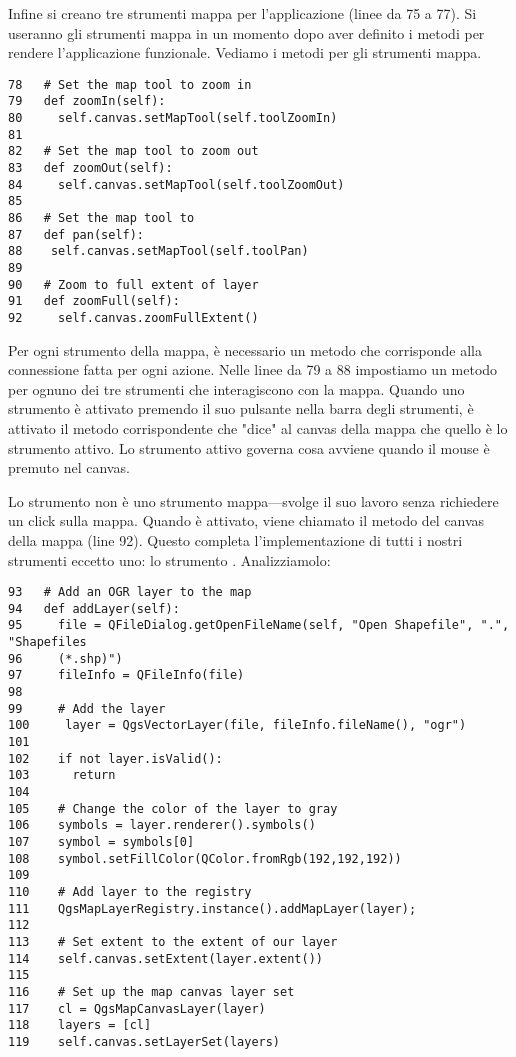 Infine si creano tre strumenti mappa per l'applicazione (linee da 75 a
77). Si useranno gli strumenti mappa in un momento dopo aver definito i metodi per rendere l'applicazione funzionale. Vediamo i metodi per gli strumenti mappa.

\begin{verbatim}
78   # Set the map tool to zoom in
79   def zoomIn(self):
80     self.canvas.setMapTool(self.toolZoomIn)
81 
82   # Set the map tool to zoom out
83   def zoomOut(self):
84     self.canvas.setMapTool(self.toolZoomOut)
85 
86   # Set the map tool to 
87   def pan(self):
88    self.canvas.setMapTool(self.toolPan)
89 
90   # Zoom to full extent of layer
91   def zoomFull(self):
92     self.canvas.zoomFullExtent()
\end{verbatim}

Per ogni strumento della mappa, è necessario un metodo che corrisponde alla connessione fatta per ogni azione. Nelle linee da 79 a 88 impostiamo un metodo per ognuno dei tre strumenti che interagiscono con la mappa. Quando uno strumento è attivato premendo il suo pulsante nella barra degli strumenti, è attivato il metodo corrispondente che "dice" al canvas della mappa che quello è lo strumento attivo. Lo strumento attivo governa cosa avviene quando il mouse è premuto nel canvas.

Lo strumento  non è uno strumento mappa---svolge il suo lavoro senza richiedere un  click sulla mappa. Quando è attivato, viene chiamato il metodo del canvas della mappa
 (line 92).  Questo completa l'implementazione di tutti i nostri strumenti eccetto uno: lo strumento . %
Analizziamolo:


\begin{verbatim}
93   # Add an OGR layer to the map
94   def addLayer(self):
95     file = QFileDialog.getOpenFileName(self, "Open Shapefile", ".", "Shapefiles
96     (*.shp)")
97     fileInfo = QFileInfo(file)
98 
99     # Add the layer
100     layer = QgsVectorLayer(file, fileInfo.fileName(), "ogr")
101
102    if not layer.isValid():
103      return
104
105    # Change the color of the layer to gray
106    symbols = layer.renderer().symbols()
107    symbol = symbols[0]
108    symbol.setFillColor(QColor.fromRgb(192,192,192))
109
110    # Add layer to the registry
111    QgsMapLayerRegistry.instance().addMapLayer(layer);
112
113    # Set extent to the extent of our layer
114    self.canvas.setExtent(layer.extent())
115
116    # Set up the map canvas layer set
117    cl = QgsMapCanvasLayer(layer)
118    layers = [cl]
119    self.canvas.setLayerSet(layers)
\end{verbatim}

